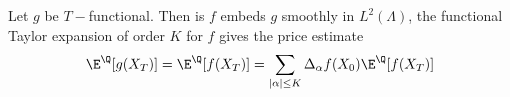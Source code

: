 Let $g$ be $T-$functional. Then is $f$ embeds $g$ smoothly  in $L^2(\Lambda)$, the functional Taylor expansion of order $K$ for $f$ gives the price estimate
$$\E^{\Q}[g(X_T)] = \E^{\Q}[f(X_T)] =\sum_{|\alpha| \le K}\Delta_{\alpha}f(X_0) \E^{\Q}[f(X_T)] $$














